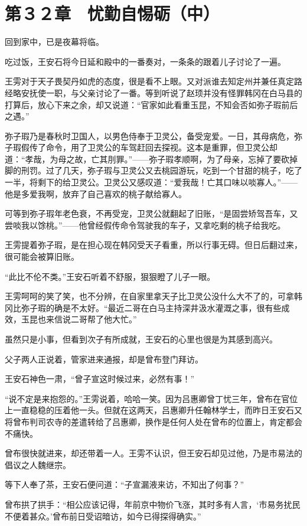 \section{第３２章　忧勤自惕砺（中）}

回到家中，已是夜幕将临。

吃过饭，王安石将今日延和殿中的一番奏对，一条条的跟着儿子讨论了一遍。

王雱对于天子畏契丹如虎的态度，很是看不上眼。又对派谁去知定州并兼任真定路经略安抚使一职，与父亲讨论了一番。等到听说了赵顼并没有怪罪韩冈在白马县的打算后，放心下来之余，却又说道：“官家如此看重玉昆，不知会否如弥子瑕前后之遇。”

弥子瑕乃是春秋时卫国人，以男色侍奉于卫灵公，备受宠爱。一日，其母病危，弥子瑕假传了命令，用了卫灵公的车驾赶回去探视。这本是重罪，但卫灵公却道：“孝哉，为母之故，亡其刖罪。”——弥子瑕孝顺啊，为了母亲，忘掉了要砍掉脚的刑罚。过了几天，弥子瑕与卫灵公又去桃园游玩，吃到一个甘甜的桃子，吃了一半，将剩下的给卫灵公。卫灵公又感叹道：“爱我哉！亡其口味以啖寡人。”——他是多爱我啊，放弃了自己喜欢的桃子献给寡人。

可等到弥子瑕年老色衰，不再受宠，卫灵公就翻起了旧账，“是固尝矫驾吾车，又尝啖我以馀桃。”——他曾经假传命令驾驶我的车子，又拿吃剩的桃子给我吃。

王雱提着弥子瑕，是在担心现在韩冈受天子看重，所以行事无碍。但日后翻过来，很可能会被算旧账。

“此比不伦不类。”王安石听着不舒服，狠狠瞪了儿子一眼。

王雱呵呵的笑了笑，也不分辨，在自家里拿天子比卫灵公没什么大不了的，可拿韩冈比弥子瑕的确是不太好。“最近二哥在白马主持深井汲水灌溉之事，很有些成效，玉昆也来信说二哥帮了他大忙。”

虽然只是小事，但看到次子有所成就，王安石的心里也很是为其感到高兴。

父子两人正说着，管家进来通报，却是曾布登门拜访。

王安石神色一肃，“曾子宣这时候过来，必然有事！”

“说不定是来抱怨的。”王雱说着，哈哈一笑。因为吕惠卿曾丁忧三年，曾布在官位上一直稳稳的压着他一头。但就在这两天，吕惠卿升任翰林学士，而昨日王安石又将曾布判司农寺的差遣转给了吕惠卿，换作是任何人处在曾布的位置上，肯定都会不痛快。

曾布很快就进来，却还带着一人。王雱不认识，但王安石却见过他，乃是市易法的倡议之人魏继宗。

等下人奉了茶，王安石便问道：“子宣漏液来访，不知出了何事？”

曾布拱了拱手：“相公应该记得，年前京中物价飞涨，其时多有人言，‘市易务扰民不便着甚众。’曾布前日受诏暗访，如今已得探得确实。”

